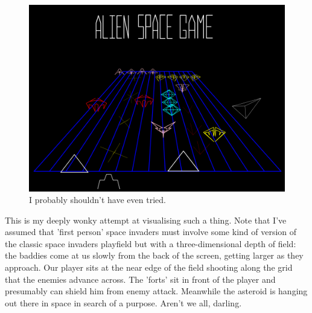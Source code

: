 \begin{figure}[H]
  \centering
        \includegraphics[width=13cm]{src/recreation/recreation-1.png}%
  \caption*{I probably shouldn't have even tried.}
\end{figure}

This is my deeply wonky attempt at visualising such
a thing. Note that I've assumed that 'first person' space invaders must involve some kind of version
of the classic space invaders playfield but with a three-dimensional depth of field: the baddies come
at us slowly from the back of the screen, getting larger as they approach. Our player sits at the near
edge of the field shooting along the grid that the enemies advance across. The 'forts' sit in front of the
player and presumably can shield him from enemy attack. Meanwhile the asteroid is hanging out there in
space in search of a purpose. Aren't we all, darling.

